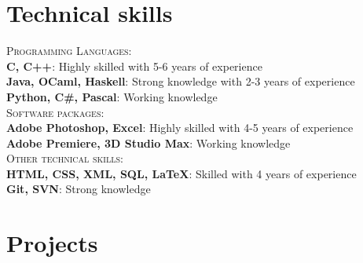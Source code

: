 \documentclass[a4paper, 10pt]{article}
\newcommand\tab[1][1cm]{\hspace*{#1}}
\begin{document}
\section{Technical skills}
 \textsc{Programming Languages:}\\
 \tab\textbf{C, C++}: Highly skilled with 5-6 years of experience\\
 \tab\textbf{Java, OCaml, Haskell}: Strong knowledge with 2-3 years of experience\\
 \tab\textbf{Python, C\#, Pascal}: Working knowledge\\
 \textsc{Software packages:}\\
 \tab\textbf{Adobe Photoshop, Excel}: Highly skilled with 4-5 years of experience\\
 \tab\textbf{Adobe Premiere, 3D Studio Max}: Working knowledge\\
 \textsc{Other technical skills:}\\
 \tab\textbf{HTML, CSS, XML, SQL, LaTeX}: Skilled with 4 years of experience\\
 \tab\textbf{Git, SVN}: Strong knowledge

\section{Projects}


\end{document}
